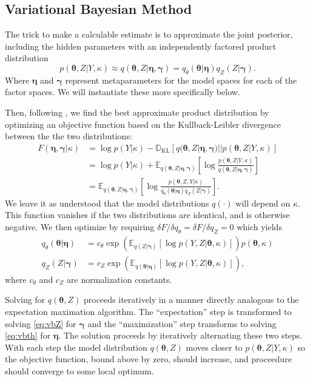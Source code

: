 \documentclass[aps,showpacs,twocolumn,prd,superscriptaddress,nofootinbib]{revtex4}
\newcommand{\be}{\begin{equation}}
\newcommand{\ee}{\end{equation}}
\newcommand{\nn}{\nonumber}
\newcommand{\E}[1]{{\mathbb E}_{#1}\!}
\begin{document}
\subsection{Variational Bayesian Method}
The trick to make a calculable estimate is to approximate the joint posterior, including the hidden parameters with an independently factored product distribution
\be
p(\bm\theta,Z|Y,\kappa)\approx q(\bm\theta,Z|\bm\eta,\bm\gamma)=q_\theta(\bm\theta|\bm\eta)q_Z(Z|\bm\gamma).
\ee
Where $\bm\eta$ and $\bm\gamma$ represent metaparameters for the model spaces for each of the factor spaces. We will instantiate these more specifically below.

Then, following \cite{Attias2000}, we find the best approximate product distribution by optimizing an objective function based on the Kullback-Leibler divergence between the the two distributions:
\begin{align}
  F(\bm\eta,\bm\gamma|\kappa)&=\log p(Y|\kappa)-\mathbb{D}_{\mathrm{KL}}\left[q(\bm\theta,Z|\bm\eta,\bm\gamma)||p(\bm\theta,Z|Y,\kappa)\right]\nn\\
  &=\log p(Y|\kappa)+\E{q(\bm\theta,Z|\bm\eta,\bm\gamma)}\left[\log\frac{p(\bm\theta,Z|Y,\kappa)}{q(\bm\theta,Z|\bm\eta,\bm\gamma)}\right]\nn\\
  &=\E{q(\bm\theta,Z|\bm\eta,\bm\gamma)}\left[\log\frac{p(\bm\theta,Z,Y|\kappa)}{q_\theta(\bm\theta|\bm\eta)q_Z(Z|\bm\gamma)}\right].\label{eq:Fdef}
\end{align}
We leave it as understood that the model distributions $q(\cdot)$ will depend on $\kappa$.
This function vanishes if the two distributions are identical, and is otherwise negative. We then optimize by requiring $\delta F/\delta q_\theta=\delta F/\delta q_Z=0$ which yields
\begin{align}
  q_\theta(\bm\theta|\bm\eta)&=c_\theta\exp\left(\E{q(Z|\bm\gamma)}\left[\log p(Y,Z|\bm\theta,\kappa)\right]\right)p(\bm\theta,\kappa)\label{eq:vbth}\\
  q_Z(Z|\bm\gamma)&=c_Z\exp\left(\E{q(\bm\theta|\bm\eta)}\left[\log p(Y,Z|\bm\theta,\kappa)\right]\right),\label{eq:vbZ}
\end{align}
where $c_\theta$ and $c_Z$ are normalization constants. 

Solving for $q(\bm\theta,Z)$ proceeds iteratively in a manner directly analogous to the expectation maximation algorithm.  The ``expectation'' step is transformed to solving \eqref{eq:vbZ} for $\bm\gamma$ and the ``maximization'' step transforms to solving \eqref{eq:vbth} for $\bm\eta$.  The solution proceeds by iteratively alternating these two steps.  With each step the model distribution $q(\bm\theta,Z)$ moves closer to $p(\bm\theta,Z|Y,\kappa)$ so the objective function, bound above by zero, should increase, and proceedure should converge to some local optimum.
\end{document}
